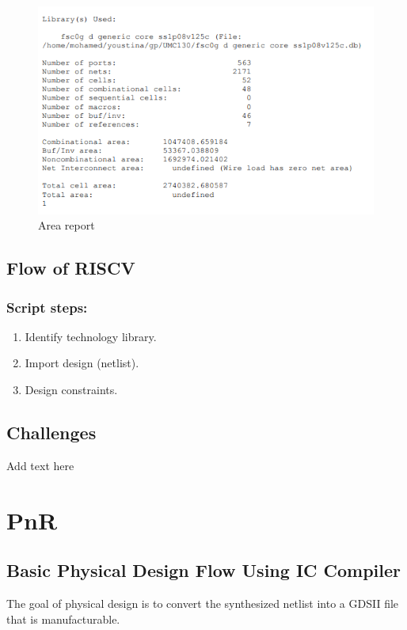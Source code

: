 \documentclass[../main.tex]{subfiles}
\begin{document}
\begin{itemize}
\begin{figure}[h!]
\centering
\includegraphics[scale = 0.8]{diagrams/area_report.PNG}
\caption{Area report}
\label{fig:area_report}
\end{figure}

\end{itemize}

    \subsection{ Flow of RISCV}
\subsubsection{Script steps:}
\begin{enumerate}
\item  Identify technology library.
\item  Import design (netlist).
\item  Design constraints.
\end{enumerate}



    \subsection{ Challenges}
    Add text here

\section{PnR}

    \subsection{ Basic Physical Design Flow Using IC Compiler}
    The goal of physical design is to convert the synthesized netlist into a GDSII file that is 
manufacturable. 
\begin{itemize}
\end{itemize}
\end{document}
